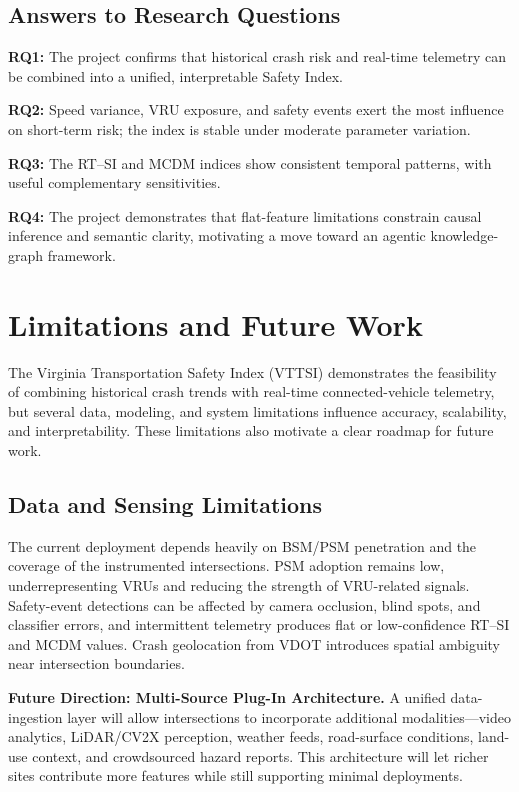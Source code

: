 \documentclass[conference]{IEEEtran}
\begin{document}
\subsection{Answers to Research Questions}

\textbf{RQ1:} The project confirms that historical crash risk and real-time telemetry can be
combined into a unified, interpretable Safety Index.

\textbf{RQ2:} Speed variance, VRU exposure, and safety events exert the most influence on
short-term risk; the index is stable under moderate parameter variation.

\textbf{RQ3:} The RT--SI and MCDM indices show consistent temporal patterns, with useful
complementary sensitivities.

\textbf{RQ4:} The project demonstrates that flat-feature limitations constrain causal inference
and semantic clarity, motivating a move toward an agentic knowledge-graph framework.

\section{Limitations and Future Work}
\label{sec:future-work}

The Virginia Transportation Safety Index (VTTSI) demonstrates the feasibility of
combining historical crash trends with real-time connected-vehicle telemetry, but several
data, modeling, and system limitations influence accuracy, scalability, and
interpretability. These limitations also motivate a clear roadmap for future work.

\subsection{Data and Sensing Limitations}

The current deployment depends heavily on BSM/PSM penetration and the coverage of the
instrumented intersections. PSM adoption remains low, underrepresenting VRUs and
reducing the strength of VRU-related signals. Safety-event detections can be affected by
camera occlusion, blind spots, and classifier errors, and intermittent telemetry produces
flat or low-confidence RT--SI and MCDM values. Crash geolocation from VDOT introduces
spatial ambiguity near intersection boundaries.

\textbf{Future Direction: Multi-Source Plug-In Architecture.}
A unified data-ingestion layer will allow intersections to incorporate additional
modalities—video analytics, LiDAR/CV2X perception, weather feeds, road-surface
conditions, land-use context, and crowdsourced hazard reports. This architecture will
let richer sites contribute more features while still supporting minimal deployments.
\end{document}
